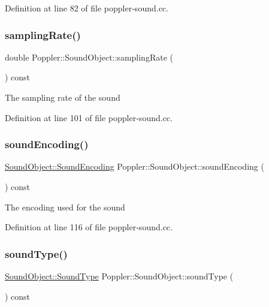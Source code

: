 Definition at line 82 of file poppler-\/sound.\+cc.

\mbox{\label{class_poppler_1_1_sound_object_a0cc54219ef559185946eb8668f162424}} 
\subsubsection{\texorpdfstring{sampling\+Rate()}{samplingRate()}}
{\footnotesize\ttfamily double Poppler\+::\+Sound\+Object\+::sampling\+Rate (\begin{DoxyParamCaption}{ }\end{DoxyParamCaption}) const}

The sampling rate of the sound 

Definition at line 101 of file poppler-\/sound.\+cc.

\mbox{\label{class_poppler_1_1_sound_object_af20191df564f702e158fdef2c6dea7a1}} 
\subsubsection{\texorpdfstring{sound\+Encoding()}{soundEncoding()}}
{\footnotesize\ttfamily \hyperlink{class_poppler_1_1_sound_object_ac59f867ef18ebd7f3a85dec136f04640}{Sound\+Object\+::\+Sound\+Encoding} Poppler\+::\+Sound\+Object\+::sound\+Encoding (\begin{DoxyParamCaption}{ }\end{DoxyParamCaption}) const}

The encoding used for the sound 

Definition at line 116 of file poppler-\/sound.\+cc.

\mbox{\label{class_poppler_1_1_sound_object_ad9a6846519683cb82dec300f4f7877b2}} 
\subsubsection{\texorpdfstring{sound\+Type()}{soundType()}}
{\footnotesize\ttfamily \hyperlink{class_poppler_1_1_sound_object_ac9f524c6c40abcbb1c9e09c29e020c5b}{Sound\+Object\+::\+Sound\+Type} Poppler\+::\+Sound\+Object\+::sound\+Type (\begin{DoxyParamCaption}{ }\end{DoxyParamCaption}) const}

